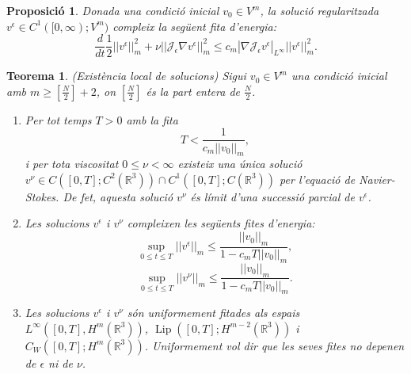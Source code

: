 \documentclass{article}
\numberwithin{equation}{section}
\DeclareMathOperator{\Lip}{Lip}
\newtheorem{teorema}{Teorema}[section]
\newtheorem{proposicio}{Proposici\'{o}}[section]
\begin{document}
\begin{proposicio}
Donada una condici\'{o} inicial $v_0\in V^m$, la soluci\'{o} regularitzada $v^{\epsilon}\in C^1([0,\infty);V^m)$ compleix la seg\"{u}ent fita d'energia:
\begin{equation}\label{Equ. limit aleatori}
\frac{d}{dt}\frac{1}{2}||v^{\epsilon}||_m^2+\nu||\mathcal{J}_{\epsilon}\nabla v^{\epsilon}||_m^2\leq c_m|\nabla\mathcal{J}_{\epsilon}v^{\epsilon}|_{L^{\infty}}||v^{\epsilon}||_m^2.
\end{equation}
\end{proposicio}

\begin{teorema}\label{Teo: existencia}
(Exist\`{e}ncia local de solucions) Sigui $v_0\in V^m$ una condici\'{o} inicial amb $m\geq\left[\frac{N}{2}\right]+2$, on $\left[\frac{N}{2}\right]$ \'{e}s la part entera de $\frac{N}{2}$.
\begin{enumerate}
\item Per tot temps $T>0$ amb la fita
\begin{equation}\label{Equ. existencia 1}
T<\frac{1}{c_m||v_0||_m},
\end{equation}
i per tota viscositat $0\leq\nu<\infty$ existeix una \'{u}nica soluci\'{o} $v^{\nu}\in C([0,T];C^2(\mathbb{R}^3))\cap C^1([0,T];C(\mathbb{R}^3))$ per l'equaci\'{o} de Navier-Stokes. De fet, aquesta soluci\'{o} $v^{\nu}$ \'{e}s l\'{i}mit d'una successi\'{o} parcial de $v^{\epsilon}$.
\item Les solucions $v^{\epsilon}$ i $v^{\nu}$ compleixen les seg\"{u}ents fites d'energia:
\begin{equation}
\sup_{0\leq t\leq T}||v^{\epsilon}||_m\leq\frac{||v_0||_m}{1-c_mT||v_0||_m},
\end{equation}
\begin{equation}
\sup_{0\leq t\leq T}||v^{\nu}||_m\leq\frac{||v_0||_m}{1-c_mT||v_0||_m}.
\end{equation}
\item Les solucions $v^{\epsilon}$ i $v^{\nu}$ s\'{o}n uniformement fitades als espais $L^{\infty}([0,T],H^m(\mathbb{R}^3))$, $\Lip([0,T];H^{m-2}(\mathbb{R}^3))$ i\\ $C_W([0,T];H^m(\mathbb{R}^3))$. Uniformement vol dir que les seves fites no depenen de $\epsilon$ ni de $\nu$.
\end{enumerate}
\end{teorema}
\end{document}
